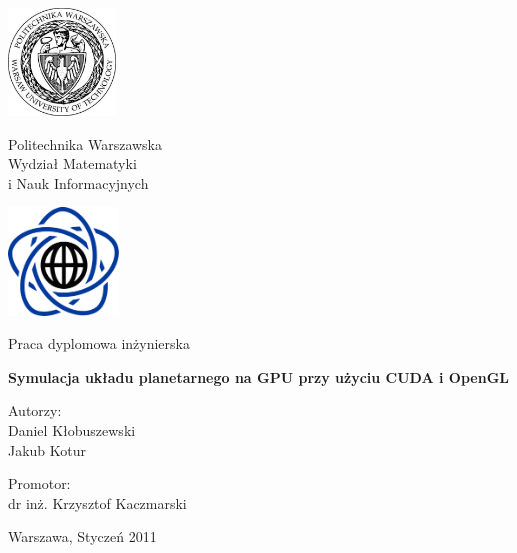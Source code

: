 \thispagestyle{empty}
\begin{center}
\Large

\begin{minipage}{0.2\linewidth}
\centering
\includegraphics[height=2.86cm]{img/logo_pw.pdf}
\end{minipage}
\begin{minipage}{0.55\linewidth}
\centering
Politechnika Warszawska \\[0.5em] Wydział Matematyki \\ i Nauk Informacyjnych
\end{minipage}
\begin{minipage}{0.2\linewidth}
\centering
\includegraphics[height=2.86cm]{img/logo_mini.pdf}
\end{minipage}

\vspace{2em}
Praca dyplomowa inżynierska
\vspace{5em}

\huge
\textbf{Symulacja układu planetarnego na GPU przy użyciu CUDA i OpenGL}

\large

\vspace{4em}

\hfill
\begin{minipage}{0.4\linewidth}
Autorzy:
\vspace{0.5em}
\\
Daniel Kłobuszewski
\\
Jakub Kotur

\vspace{1em}

Promotor:
\vspace{0.5em}
\\
dr inż. Krzysztof Kaczmarski
\end{minipage}

\vfill
Warszawa, Styczeń 2011
\end{center}

